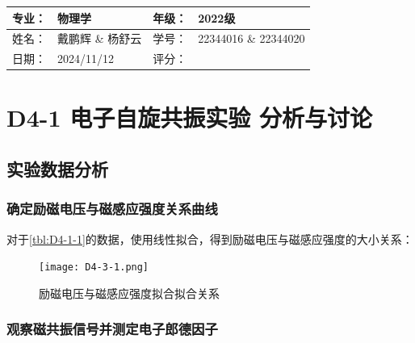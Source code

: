 \documentclass[dvipsnames, svgnames,a4paper,11pt]{article}
\begin{document}



	

\clearpage
\begin{table}
	\renewcommand\arraystretch{1.7}
	\begin{tabularx}{\textwidth}{|X|X|X|X|}
	\hline
	专业：& 物理学 &年级：& 2022级\\
	\hline
	姓名： & 戴鹏辉 \& 杨舒云 & 学号：& 22344016 \& 22344020\\
	\hline
    日期：& 2024/11/12 & 评分： &\\
	\hline
	\end{tabularx}
\end{table}

\section{D4-1 \quad 电子自旋共振实验 \quad\heiti 分析与讨论}

\subsection{实验数据分析}



	\subsubsection{确定励磁电压与磁感应强度关系曲线}

		对于\cref{tbl:D4-1-1}的数据，使用线性拟合，得到励磁电压与磁感应强度的大小关系：

		\begin{figure}[htbp]
			\centering
			\texttt{[image: D4-3-1.png]}
			\caption{励磁电压与磁感应强度拟合拟合关系}
			\label{fig:D4-3-1}
		\end{figure}



	\subsubsection{观察磁共振信号并测定电子郎德因子}
\end{document}
